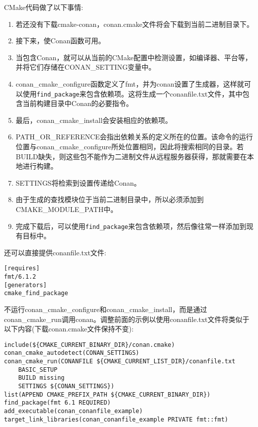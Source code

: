 CMake代码做了以下事情:

\begin{enumerate}
\item 
若还没有下载cmake-conan，conan.cmake文件将会下载到当前二进制目录下。

\item 
接下来，使Conan函数可用。

\item 
当包含Conan，就可以从当前的CMake配置中检测设置，如编译器、平台等，并将它们存储在CONAN\_SETTING变量中。

\item 
conan\_cmake\_configure函数定义了fmt，并为conan设置了生成器，这样就可以使用\texttt{find\_package}来包含依赖项。这将生成一个conanfile.txt文件，其中包含当前构建目录中Conan的必要指令。

\item 
最后，conan\_cmake\_install会安装相应的依赖项。

\item 
PATH\_OR\_REFERENCE会指出依赖关系的定义所在的位置。该命令的运行位置与conan\_cmake\_configure所处位置相同，因此将搜索相同的目录。若BUILD缺失，则这些包不能作为二进制文件从远程服务器获得，那就需要在本地进行构建。

\item 
SETTINGS将检索到设置传递给Conan。

\item 
由于生成的查找模块位于当前二进制目录中，所以必须添加到CMAKE\_MODULE\_PATH中。

\item 
完成下载后，可以使用\texttt{find\_package}来包含依赖项，然后像往常一样添加到现有目标中。
\end{enumerate}

还可以直接提供conanfile.txt文件:

\begin{lstlisting}[style=styleCMake]
[requires]
fmt/6.1.2
[generators]
cmake_find_package
\end{lstlisting}

不运行conan\_cmake\_configure和conan\_cmake\_install，而是通过conan\_cmake\_run调用conan。调整前面的示例以使用conanfile.txt文件将类似于以下内容(下载conan.cmake文件保持不变):

\begin{lstlisting}[style=styleCMake]
include(${CMAKE_CURRENT_BINARY_DIR}/conan.cmake)
conan_cmake_autodetect(CONAN_SETTINGS)
conan_cmake_run(CONANFILE ${CMAKE_CURRENT_LIST_DIR}/conanfile.txt
	BASIC_SETUP
	BUILD missing
	SETTINGS ${CONAN_SETTINGS})
list(APPEND CMAKE_PREFIX_PATH ${CMAKE_CURRENT_BINARY_DIR})
find_package(fmt 6.1 REQUIRED)
add_executable(conan_conanfile_example)
target_link_libraries(conan_conanfile_example PRIVATE fmt::fmt)
\end{lstlisting}

